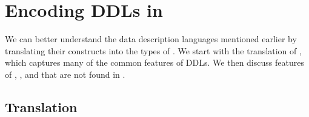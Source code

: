 \section{Encoding DDLs in \ddc{}}
\label{sec:encodings}

We can better understand the data description languages mentioned
earlier by translating their constructs into the types of \ddc{}. We
start with the translation of \ipads{}, which captures many of the
common features of DDLs. We then discuss features of \pads{},
\datascript{}, and \packettypes{} that are not found in \ipads{}.
\subsection{\ipads{} Translation}
\label{sec:trans-sl}

